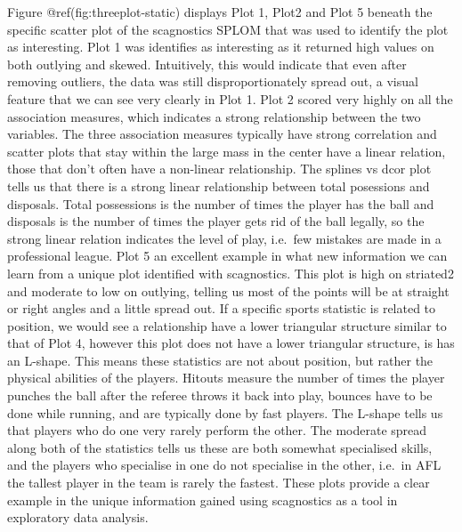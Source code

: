 Figure @ref(fig:threeplot-static) displays Plot 1, Plot2 and Plot 5
beneath the specific scatter plot of the scagnostics SPLOM that was used
to identify the plot as interesting. Plot 1 was identifies as
interesting as it returned high values on both outlying and skewed.
Intuitively, this would indicate that even after removing outliers, the
data was still disproportionately spread out, a visual feature that we
can see very clearly in Plot 1. Plot 2 scored very highly on all the
association measures, which indicates a strong relationship between the
two variables. The three association measures typically have strong
correlation and scatter plots that stay within the large mass in the
center have a linear relation, those that don't often have a non-linear
relationship. The splines vs dcor plot tells us that there is a strong
linear relationship between total posessions and disposals. Total
possessions is the number of times the player has the ball and disposals
is the number of times the player gets rid of the ball legally, so the
strong linear relation indicates the level of play, i.e.~few mistakes
are made in a professional league. Plot 5 an excellent example in what
new information we can learn from a unique plot identified with
scagnostics. This plot is high on striated2 and moderate to low on
outlying, telling us most of the points will be at straight or right
angles and a little spread out. If a specific sports statistic is
related to position, we would see a relationship have a lower triangular
structure similar to that of Plot 4, however this plot does not have a
lower triangular structure, is has an L-shape. This means these
statistics are not about position, but rather the physical abilities of
the players. Hitouts measure the number of times the player punches the
ball after the referee throws it back into play, bounces have to be done
while running, and are typically done by fast players. The L-shape tells
us that players who do one very rarely perform the other. The moderate
spread along both of the statistics tells us these are both somewhat
specialised skills, and the players who specialise in one do not
specialise in the other, i.e.~in AFL the tallest player in the team is
rarely the fastest. These plots provide a clear example in the unique
information gained using scagnostics as a tool in exploratory data
analysis.

